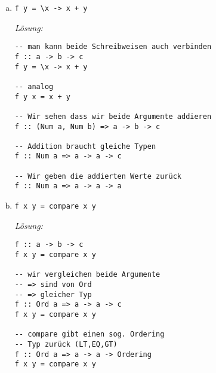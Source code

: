 \documentclass{article}
\begin{document}
\begin{enumerate} [a)]
    \textit{Lösung:}
    \begin{mdframed}[backgroundcolor=bg]
        \begin{verbatim}
-- Das ist eine Lambda-Funktion die genauso
-- wie in b) ein Argument nimmt.
f :: a -> b
f = \x -> x
-- analog
f x = x
-- Wir können keine Aussagen über den genauen Typ
-- sagen, aber wir wissen das wir 'x' zurückgeben
f :: a -> a
        \end{verbatim}
    \end{mdframed}

    \item \begin{verbatim}
f y = \x -> x + y
          \end{verbatim}

    \textit{Lösung:}
    \begin{mdframed}[backgroundcolor=bg]
        \begin{verbatim}
-- man kann beide Schreibweisen auch verbinden
f :: a -> b -> c
f y = \x -> x + y

-- analog
f y x = x + y

-- Wir sehen dass wir beide Argumente addieren
f :: (Num a, Num b) => a -> b -> c

-- Addition braucht gleiche Typen
f :: Num a => a -> a -> c

-- Wir geben die addierten Werte zurück
f :: Num a => a -> a -> a
        \end{verbatim}
    \end{mdframed}

\newpage
    \item \begin{verbatim}
f x y = compare x y
          \end{verbatim}

    \textit{Lösung:}
    \begin{mdframed}[backgroundcolor=bg]
        \begin{verbatim}
f :: a -> b -> c
f x y = compare x y

-- wir vergleichen beide Argumente
-- => sind von Ord
-- => gleicher Typ
f :: Ord a => a -> a -> c
f x y = compare x y

-- compare gibt einen sog. Ordering
-- Typ zurück (LT,EQ,GT)
f :: Ord a => a -> a -> Ordering
f x y = compare x y
         \end{verbatim}
    \end{mdframed}


\end{enumerate}
\end{document}
